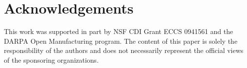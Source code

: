 \section{Acknowledgements}

This work was supported in part by NSF CDI Grant ECCS 0941561 and the
DARPA Open Manufacturing program. The content of this paper is solely
the responsibility of the authors and does not necessarily represent
the official views of the sponsoring organizations.

